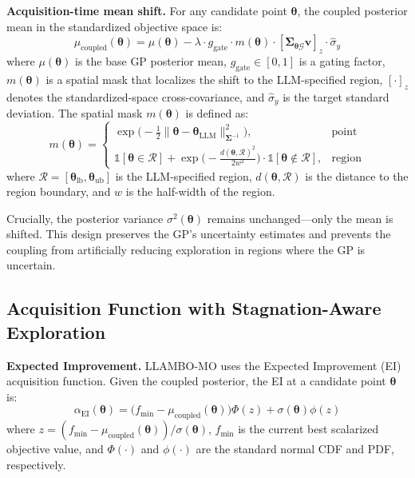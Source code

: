 \documentclass[lettersize,journal]{IEEEtran}
\begin{document}
\textbf{Acquisition-time mean shift.} For any candidate point $\boldsymbol{\theta}$, the coupled posterior mean in the standardized objective space is:
\begin{equation}
\label{eq:coupled_mean}
\mu_{\text{coupled}}(\boldsymbol{\theta}) = \mu(\boldsymbol{\theta}) - \lambda \cdot g_{\text{gate}} \cdot m(\boldsymbol{\theta}) \cdot \left[\boldsymbol{\Sigma}_{\boldsymbol{\theta}\mathcal{G}} \boldsymbol{v}\right]_z \cdot \hat{\sigma}_y
\end{equation}
where $\mu(\boldsymbol{\theta})$ is the base GP posterior mean, $g_{\text{gate}} \in [0, 1]$ is a gating factor, $m(\boldsymbol{\theta})$ is a spatial mask that localizes the shift to the LLM-specified region, $[\cdot]_z$ denotes the standardized-space cross-covariance, and $\hat{\sigma}_y$ is the target standard deviation. The spatial mask $m(\boldsymbol{\theta})$ is defined as:
\begin{equation}
\label{eq:spatial_mask}
m(\boldsymbol{\theta}) = \begin{cases}
\exp\!\bigl(-\tfrac{1}{2} \|\boldsymbol{\theta} - \boldsymbol{\theta}_{\text{LLM}}\|_{\boldsymbol{\Sigma}^{-1}}^2\bigr), & \text{point} \\
\mathbb{1}[\boldsymbol{\theta} \in \mathcal{R}] + \exp\!\bigl(-\tfrac{d(\boldsymbol{\theta}, \mathcal{R})^2}{2w^2}\bigr) \cdot \mathbb{1}[\boldsymbol{\theta} \notin \mathcal{R}], & \text{region}
\end{cases}
\end{equation}
where $\mathcal{R} = [\boldsymbol{\theta}_{\text{lb}}, \boldsymbol{\theta}_{\text{ub}}]$ is the LLM-specified region, $d(\boldsymbol{\theta}, \mathcal{R})$ is the distance to the region boundary, and $w$ is the half-width of the region.

Crucially, the posterior variance $\sigma^2(\boldsymbol{\theta})$ remains unchanged---only the mean is shifted. This design preserves the GP's uncertainty estimates and prevents the coupling from artificially reducing exploration in regions where the GP is uncertain.

\subsection{Acquisition Function with Stagnation-Aware Exploration}

\textbf{Expected Improvement.} LLAMBO-MO uses the Expected Improvement (EI) acquisition function. Given the coupled posterior, the EI at a candidate point $\boldsymbol{\theta}$ is:
\begin{equation}
\label{eq:ei}
\alpha_{\text{EI}}(\boldsymbol{\theta}) = \bigl(f_{\min} - \mu_{\text{coupled}}(\boldsymbol{\theta})\bigr) \Phi(z) + \sigma(\boldsymbol{\theta}) \phi(z)
\end{equation}
where $z = (f_{\min} - \mu_{\text{coupled}}(\boldsymbol{\theta})) / \sigma(\boldsymbol{\theta})$, $f_{\min}$ is the current best scalarized objective value, and $\Phi(\cdot)$ and $\phi(\cdot)$ are the standard normal CDF and PDF, respectively.
\end{document}

